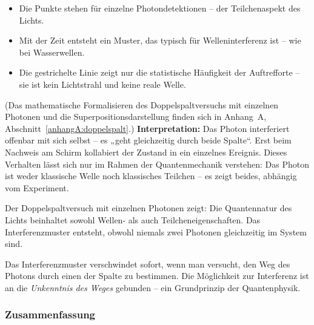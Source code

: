\begin{tcolorbox}[physikbox, title=Was die Photonengrafik zeigen soll]
	\label{box:was die photonengrafik}
	\small
	\begin{itemize}
		\item Die Punkte stehen für einzelne Photondetektionen – der Teilchenaspekt des Lichts.
		\item Mit der Zeit entsteht ein Muster, das typisch für Welleninterferenz ist – wie bei Wasserwellen.
		\item Die gestrichelte Linie zeigt nur die statistische Häufigkeit der Auftrefforte – sie ist kein Lichtstrahl und keine reale Welle.
	\end{itemize}
\end{tcolorbox}
\medskip
(Das mathematische Formalisieren des Doppelspaltversuchs mit einzelnen Photonen und die Superpositionsdarstellung finden sich in Anhang~A, Abschnitt~\ref{anhangA:doppelspalt}.) %
\textbf{Interpretation:}  
Das Photon interferiert offenbar mit sich selbst – es „geht gleichzeitig durch beide Spalte“. Erst beim Nachweis am Schirm kollabiert der Zustand in ein einzelnes Ereignis. Dieses Verhalten lässt sich nur im Rahmen der Quantenmechanik verstehen: Das Photon ist weder klassische Welle noch klassisches Teilchen – es zeigt beides, abhängig vom Experiment.

\medskip
\begin{tcolorbox}[hypobox, title=Schlüsselidee]
	\label{box:schlüsselidee}
	\small
	Der Doppelspaltversuch mit einzelnen Photonen zeigt: Die Quantennatur des Lichts beinhaltet sowohl Wellen- als auch Teilcheneigenschaften. Das Interferenzmuster entsteht, obwohl niemals zwei Photonen gleichzeitig im System sind.
\end{tcolorbox}
\medskip
\begin{tcolorbox}[didaktikbox, title=Wellen-als auch Teilcheneigenschaften]
	\label{box:wellen}
	\small
	Das Interferenzmuster verschwindet sofort, wenn man versucht, den Weg des Photons durch einen der Spalte zu bestimmen. Die Möglichkeit zur Interferenz ist an die \emph{Unkenntnis des Weges} gebunden – ein Grundprinzip der Quantenphysik.
\end{tcolorbox}

\subsubsection*{Zusammenfassung}

